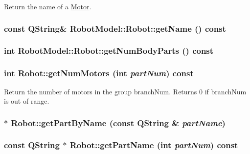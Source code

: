 Return the name of a \hyperlink{class_robot_model_1_1_motor}{Motor}. \hypertarget{class_robot_model_1_1_robot_a07a4dcd2c34da89415576c53b42d9406}{
\subsubsection[{getName}]{\setlength{\rightskip}{0pt plus 5cm}const QString\& RobotModel::Robot::getName () const}}
\label{class_robot_model_1_1_robot_a07a4dcd2c34da89415576c53b42d9406}
\hypertarget{class_robot_model_1_1_robot_a16f942cf3364608585f5a352be0dc286}{
\subsubsection[{getNumBodyParts}]{\setlength{\rightskip}{0pt plus 5cm}int RobotModel::Robot::getNumBodyParts () const}}
\label{class_robot_model_1_1_robot_a16f942cf3364608585f5a352be0dc286}
\hypertarget{class_robot_model_1_1_robot_ac291608df7ce0cbe818d2da837ca008a}{
\subsubsection[{getNumMotors}]{\setlength{\rightskip}{0pt plus 5cm}int Robot::getNumMotors (int {\em partNum}) const}}
\label{class_robot_model_1_1_robot_ac291608df7ce0cbe818d2da837ca008a}


Return the number of motors in the group branchNum. Returns 0 if branchNum is out of range. \hypertarget{class_robot_model_1_1_robot_af23f77831c87476ad0a43c624dd4b254}{
\subsubsection[{getPartByName}]{ $\ast$ Robot::getPartByName (const QString \& {\em partName})}}
\label{class_robot_model_1_1_robot_af23f77831c87476ad0a43c624dd4b254}
\hypertarget{class_robot_model_1_1_robot_a108ec79a213fbc7655595f1716150436}{
\subsubsection[{getPartName}]{\setlength{\rightskip}{0pt plus 5cm}const QString $\ast$ Robot::getPartName (int {\em partNum}) const}}
\label{class_robot_model_1_1_robot_a108ec79a213fbc7655595f1716150436}


